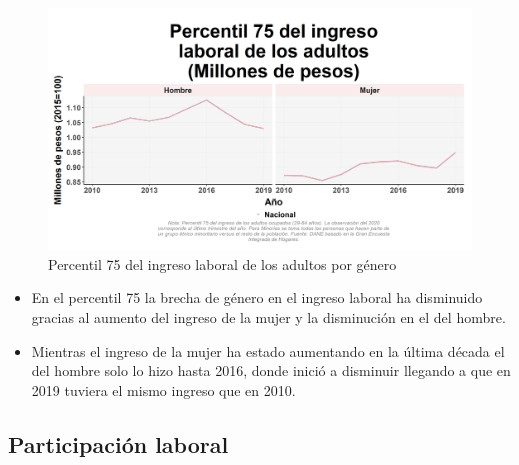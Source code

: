     \begin{figure}[H]
        \caption{Percentil 75 del ingreso laboral de los adultos por género \label{map_result_2} }
        \begin{center}
        \includegraphics[width=\textwidth,keepaspectratio]{img/var_29_trend.png}
        \end{center}
    \end{figure}
            \begin{itemize}
                \item En el percentil 75 la brecha de género en el ingreso laboral ha disminuido gracias al aumento del ingreso de la mujer y la disminución en el del hombre.
                \item Mientras el ingreso de la mujer ha estado aumentando en la última década el del hombre solo lo hizo hasta 2016, donde inició a disminuir llegando a que en 2019 tuviera el mismo ingreso que en 2010.
                \end{itemize}

    \subsection{Participación laboral}

